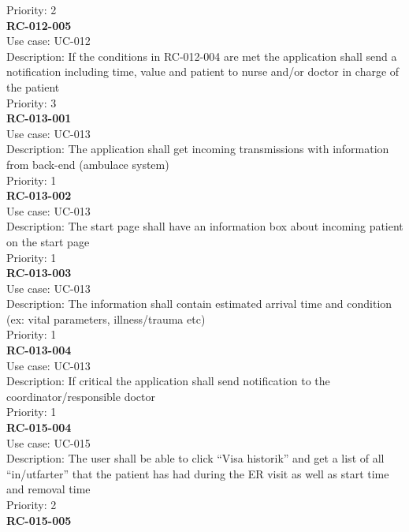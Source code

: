 Priority: 2 \\
\newline
\textbf{RC-012-005} \\
Use case: UC-012 \\
Description: If the conditions in RC-012-004 are met the application shall send a notification including time, value and patient to nurse and/or doctor in charge of the patient \\
Priority: 3 \\
\newline
\newline
\textbf{RC-013-001} \\
Use case: UC-013 \\
Description: The application shall get incoming transmissions with information from back-end (ambulace system) \\
Priority: 1 \\
\newline
\textbf{RC-013-002} \\
Use case: UC-013 \\
Description: The start page shall have an information box about incoming patient on the start page \\
Priority: 1 \\
\newline
\textbf{RC-013-003} \\
Use case: UC-013 \\
Description: The information shall contain estimated arrival time and condition (ex: vital parameters, illness/trauma etc) \\
Priority: 1 \\
\newline
\textbf{RC-013-004} \\
Use case: UC-013 \\
Description: If critical the application shall send notification to the coordinator/responsible doctor \\
Priority: 1 \\
\newline
\textbf{RC-015-004} \\
Use case: UC-015 \\
Description: The user shall be able to click “Visa historik” and get a list of all “in/utfarter” that the patient has had during the ER visit as well as start time and removal time \\
Priority: 2 \\
\newline
\textbf{RC-015-005} \\
